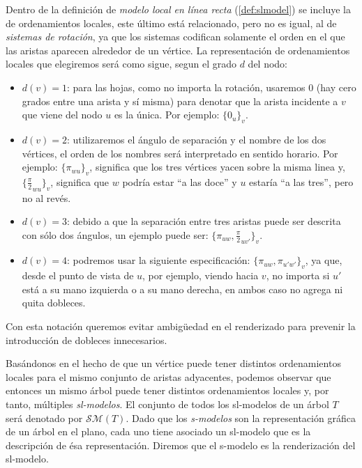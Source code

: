 Dentro de la definición de \textit{modelo local en línea recta} (\ref{def:slmodel}) se incluye la de ordenamientos locales, este último está relacionado, pero no es igual, al de \textit{sistemas de rotaci\'on}, ya que los sistemas codifican solamente el orden en el que las aristas aparecen alrededor de un v\'ertice. La representación de ordenamientos locales que elegiremos será como sigue, segun el grado $d$ del nodo:

\begin{itemize}
    \item $d(v) = 1$: para las hojas, como no importa la rotación, usaremos $0$ (hay cero grados entre una arista y sí misma) para denotar que la arista incidente a $v$ que viene del nodo $u$ es la única. Por ejemplo: $\{0_u\}_v$.
    \item $d(v) = 2$: utilizaremos el ángulo de separación y el nombre de los dos vértices, el orden de los nombres será interpretado en sentido horario. Por ejemplo: $\{\pi_{wu}\}_v$, significa que los tres vértices yacen sobre la misma linea y, $\{\frac{\pi}{2}_{wu}\}_v$, significa que $w$ podría estar ``a las doce'' y $u$ estaría ``a las tres'', pero no al revés.
    \item $d(v) = 3$: debido a que la separación entre tres aristas puede ser descrita con sólo dos ángulos, un ejemplo puede ser: $\{\pi_{uw}, \frac{\pi}{2}_{uv'}\}_v$.
    \item $d(v) = 4$: podremos usar la siguiente especificación: $\{\pi_{uw}, \pi_{u'w'}\}_v$, ya que, desde el punto de vista de $u$, por ejemplo, viendo hacia $v$, no importa si $u'$ está a su mano izquierda o a su mano derecha, en ambos caso no agrega ni quita dobleces.
\end{itemize}

Con esta notación queremos evitar ambigüedad en el renderizado para prevenir la introducci\'on de dobleces innecesarios.

Basándonos en el hecho de que un vértice puede tener distintos ordenamientos locales para el mismo conjunto de aristas adyacentes, podemos observar que entonces un mismo árbol puede tener distintos ordenamientos locales y, por tanto, múltiples \textit{sl-modelos}. El conjunto de todos los sl-modelos de un árbol $T$ será denotado por $\mathcal{SM}(T)$. Dado que los \textit{s-modelos} son la representación gráfica de un árbol en el plano, cada uno tiene asociado un sl-modelo que es la descripción de ésa representación. Diremos que el s-modelo es la renderización del sl-modelo.

